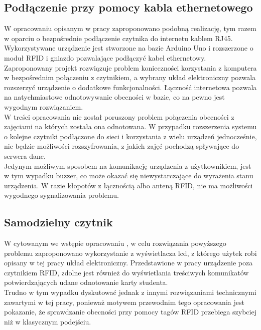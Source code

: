 \documentclass[declaration,shortabstract, mgr]{iithesis}
\begin{document}
\subsection{Podłączenie przy pomocy kabla ethernetowego}
\indent W opracowaniu opisanym w pracy \cite{rfid_serial} zaproponowano podobną realizację, tym razem w oparciu o bezpośrednie podłączenie czytnika do internetu kablem RJ45. Wykorzystywane urządzenie jest stworzone na bazie Arduino Uno i rozszerzone o moduł RFID i gniazdo pozwalające podłączyć kabel ethernetowy. \\
\indent Zaproponowany projekt rozwiązuje problem konieczności korzystania z komputera w bezpośrednim połączeniu z czytnikiem, a wybrany układ elektroniczny pozwala rozszerzyć urządzenie o dodatkowe funkcjonalności. Łączność internetowa pozwala na natychmiastowe odnotowywanie obecności w bazie, co na pewno jest wygodnym rozwiązaniem. \\
\indent W treści opracowania nie został poruszony problem połączenia obecności z zajęciami na których została ona odnotowana. W przypadku rozszerzenia systemu o kolejne czytniki podłączone do sieci i korzystania z wielu urządzeń jednocześnie, nie będzie możliwości rozszyfrowania, z jakich zajęć pochodzą spływające do serwera dane. \\
\indent Jedynym możliwym sposobem na komunikację urządzenia z użytkownikiem, jest w tym wypadku buzzer, co może okazać się niewystarczające do wyrażenia stanu urządzenia. W razie kłopotów z łącznością albo anteną RFID, nie ma możliwości wygodnego sygnalizowania problemu.

\subsection{Samodzielny czytnik }
\indent W cytowanym we wstępie opracowaniu \cite{lcd}, w celu rozwiązania powyższego problemu zaproponowano wykorzystanie z wyświetlacza lcd, z którego użytek robi opisany w tej pracy układ elektroniczny. Przedstawione w pracy urządzenie poza czytnikiem RFID, zdolne jest również do wyświetlania treściwych komunikatów potwierdzających udane odnotowanie karty studenta. \\
\indent Trudno w tym wypadku dyskutować jednak z innymi rozwiązaniami technicznymi zawartymi w tej pracy, ponieważ motywem przewodnim tego opracowania jest pokazanie, że sprawdzanie obecności przy pomocy tagów RFID przebiega szybciej niż w klasycznym podejściu.
\end{document}
